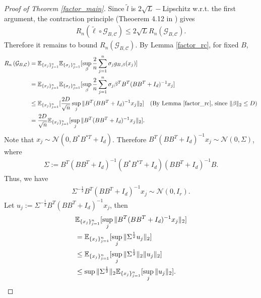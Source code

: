 \begin{proof}[Proof of Theorem \ref{factor_main}]
Since $\tilde{l}$ is $2\sqrt{L}-$Lipschitz w.r.t. the first argument, the contraction principle (Theoerem 4.12 in \cite{ledoux1991probability}) gives
\begin{align}
R_n\left(\tilde{\ell} \circ \mathcal{G}_{B , \mathcal{C}}\right) \leq 2\sqrt{L} R_n\left(\mathcal{G}_{B , \mathcal{C}}\right).
\end{align}
Therefore it remains to bound $R_n\left(\mathcal{G}_{B , \mathcal{C}}\right).$ By Lemma \ref{factor_rc}, for fixed $B$,
\begin{align}\label{092730}
R_n\left(\mathcal{G}_{B, \mathcal{C}}\right) &= \mathbb{E}_{\{x_{j}\}_{j=1}^{n}} \mathbb{E}_{\{\sigma_{j}\}_{j=1}^{n}}  [\sup_{\beta}\frac{2}{n}\sum_{j=1}^{n} \sigma_{j} g_{B,\beta}(x_{j})] \notag \\
&= \mathbb{E}_{\{x_{j}\}_{j=1}^{n}} \mathbb{E}_{\{\sigma_{j}\}_{j=1}^{n}} [\sup_{\beta}\frac{2}{n}\sum_{j=1}^{n} \sigma_{j} \beta^{T} B^{T} (BB^{T}+I_{d})^{-1} x_{j}] \notag \\
& \leq \mathbb{E}_{\{x_{j}\}_{j=1}^{n}} [\frac{2D}{\sqrt{n}} \sup_{j} \|B^{T} (BB^{T}+I_{d})^{-1} x_{j}\|_{2}]  \quad \text{(By Lemma \ref{factor_rc}, since }\|\beta\|_2\leq D ) \notag \\
&= \frac{2D}{\sqrt{n}} \mathbb{E}_{\{x_{j}\}_{j=1}^{n}} [ \sup_{j} \|B^{T} (BB^{T}+I_{d})^{-1} x_{j}\|_{2}].
\end{align}
Note that $x_{j}\sim \mathcal{N}(0,B^{*}B^{* T}+ I_{d})$. Therefore $B^{T} (BB^{T}+I_{d})^{-1} x_{j} \sim \mathcal{N}(0,\Sigma)$, where
\begin{align}
\Sigma:= B^{T} (BB^{T}+I_{d})^{-1}  (B^{*}B^{* T}+ I_{d}) (BB^{T}+I_{d})^{-1} B.
\end{align}
Thus, we have
\begin{align}
\Sigma^{-\frac{1}{2}} B^{T} (BB^{T}+I_{d})^{-1} x_{j} \sim \mathcal{N}(0,I_{r}).
\end{align}
Let $u_{j}:=\Sigma^{-\frac{1}{2}} B^{T} (BB^{T}+I_{d})^{-1} x_{j}$, then
\begin{align}\label{092731}
&\mathbb{E}_{\{x_{j}\}_{j=1}^{n}} [ \sup_{j} \|B^{T} (BB^{T}+I_{d})^{-1} x_{j}\|_{2}] \notag \\
&= \mathbb{E}_{\{x_{j}\}_{j=1}^{n}} [ \sup_{j} \|\Sigma^{\frac{1}{2} }u_{j}\|_{2}] \notag \\
&\leq \mathbb{E}_{\{x_{j}\}_{j=1}^{n}} [  \sup_{j} \|\Sigma^{\frac{1}{2}}\|_{2} \| u_{j}\|_{2}] \notag \\ &\leq \sup \|\Sigma^{\frac{1}{2}}\|_{2}\mathbb{E}_{\{x_{j}\}_{j=1}^{n}} [  \sup_{j}  \| u_{j}\|_{2}] .

\end{align}
\end{proof}
